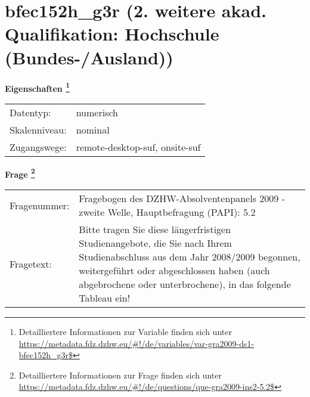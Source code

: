 
    \setcounter{footnote}{0}

    \vspace*{-1.8cm}
	\section{bfec152h\_g3r (2. weitere akad. Qualifikation: Hochschule (Bundes-/Ausland))}
	\label{section:bfec152h_g3r}



    \vspace*{0.5cm}
    \noindent\textbf{Eigenschaften
	\footnote{Detailliertere Informationen zur Variable finden sich unter
		\url{https://metadata.fdz.dzhw.eu/\#!/de/variables/var-gra2009-ds1-bfec152h_g3r$}}}\\
	\begin{tabularx}{\hsize}{@{}lX}
	Datentyp: & numerisch \\
	Skalenniveau: & nominal \\
	Zugangswege: &
	  remote-desktop-suf, 
	  onsite-suf
 \\
    \end{tabularx}



				\vspace*{0.5cm}
                \noindent\textbf{Frage
	                \footnote{Detailliertere Informationen zur Frage finden sich unter
		              \url{https://metadata.fdz.dzhw.eu/\#!/de/questions/que-gra2009-ins2-5.2$}}}\\
				\begin{tabularx}{\hsize}{@{}lX}
					Fragenummer: &
					  Fragebogen des DZHW-Absolventenpanels 2009 - zweite Welle, Hauptbefragung (PAPI):
					  5.2
 \\
					Fragetext: & Bitte tragen Sie diese längerfristigen Studienangebote, die Sie nach Ihrem Studienabschluss aus dem Jahr 2008/2009 begonnen, weitergeführt oder abgeschlossen haben (auch abgebrochene oder unterbrochene), in das folgende Tableau ein! \\
				\end{tabularx}





